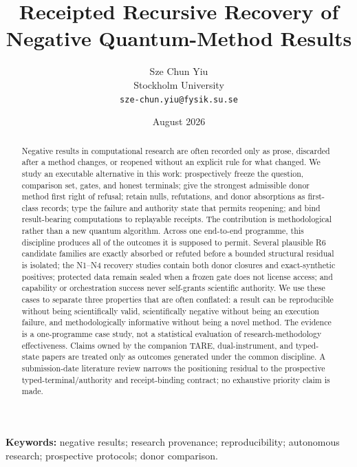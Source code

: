\documentclass[11pt]{article}
\title{Receipted Recursive Recovery of Negative Quantum-Method Results}
\author{Sze Chun Yiu\\Stockholm University\\\texttt{sze-chun.yiu@fysik.su.se}}
\date{August 2026}
\begin{document}
\maketitle

\begin{abstract}
Negative results in computational research are often recorded only as prose, discarded after a method changes, or reopened without an explicit rule for what changed. We study an executable alternative in this work: prospectively freeze the question, comparison set, gates, and honest terminals; give the strongest admissible donor method first right of refusal; retain nulls, refutations, and donor absorptions as first-class records; type the failure and authority state that permits reopening; and bind result-bearing computations to replayable receipts. The contribution is methodological rather than a new quantum algorithm. Across one end-to-end programme, this discipline produces all of the outcomes it is supposed to permit. Several plausible R6 candidate families are exactly absorbed or refuted before a bounded structural residual is isolated; the N1--N4 recovery studies contain both donor closures and exact-synthetic positives; protected data remain sealed when a frozen gate does not license access; and capability or orchestration success never self-grants scientific authority. We use these cases to separate three properties that are often conflated: a result can be reproducible without being scientifically valid, scientifically negative without being an execution failure, and methodologically informative without being a novel method. The evidence is a one-programme case study, not a statistical evaluation of research-methodology effectiveness. Claims owned by the companion TARE, dual-instrument, and typed-state papers are treated only as outcomes generated under the common discipline. A submission-date literature review narrows the positioning residual to the prospective typed-terminal/authority and receipt-binding contract; no exhaustive priority claim is made.
\end{abstract}

\noindent\textbf{Keywords:} negative results; research provenance; reproducibility; autonomous research; prospective protocols; donor comparison.













\end{document}
